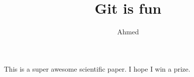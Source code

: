 \documentclass[10pt]{article}
\author{Ahmed}
\title{Git is fun}
\begin{document}
	\maketitle

	This is a super awesome scientific paper.
	I hope I win a prize.
\end{document}
